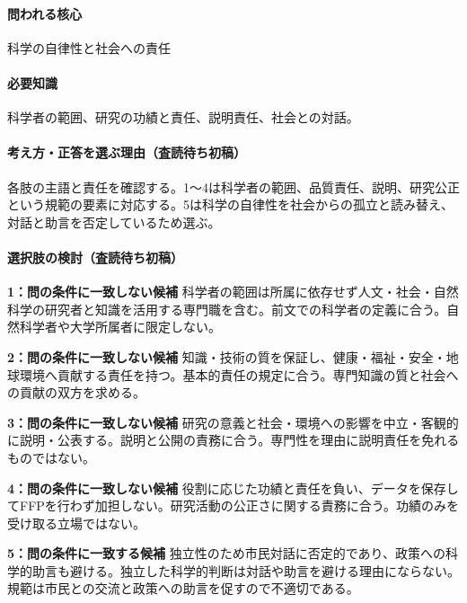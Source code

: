 \paragraph{問われる核心} 科学の自律性と社会への責任

\paragraph{必要知識} 科学者の範囲、研究の功績と責任、説明責任、社会との対話。

\paragraph{考え方・正答を選ぶ理由（査読待ち初稿）} 各肢の主語と責任を確認する。1〜4は科学者の範囲、品質責任、説明、研究公正という規範の要素に対応する。5は科学の自律性を社会からの孤立と読み替え、対話と助言を否定しているため選ぶ。

\paragraph{選択肢の検討（査読待ち初稿）}\mbox{}\par

\noindent\textbf{1：問の条件に一致しない候補} 科学者の範囲は所属に依存せず人文・社会・自然科学の研究者と知識を活用する専門職を含む。前文での科学者の定義に合う。自然科学者や大学所属者に限定しない。\par

\noindent\textbf{2：問の条件に一致しない候補} 知識・技術の質を保証し、健康・福祉・安全・地球環境へ貢献する責任を持つ。基本的責任の規定に合う。専門知識の質と社会への貢献の双方を求める。\par

\noindent\textbf{3：問の条件に一致しない候補} 研究の意義と社会・環境への影響を中立・客観的に説明・公表する。説明と公開の責務に合う。専門性を理由に説明責任を免れるものではない。\par

\noindent\textbf{4：問の条件に一致しない候補} 役割に応じた功績と責任を負い、データを保存してFFPを行わず加担しない。研究活動の公正さに関する責務に合う。功績のみを受け取る立場ではない。\par

\noindent\textbf{5：問の条件に一致する候補} 独立性のため市民対話に否定的であり、政策への科学的助言も避ける。独立した科学的判断は対話や助言を避ける理由にならない。規範は市民との交流と政策への助言を促すので不適切である。\par

